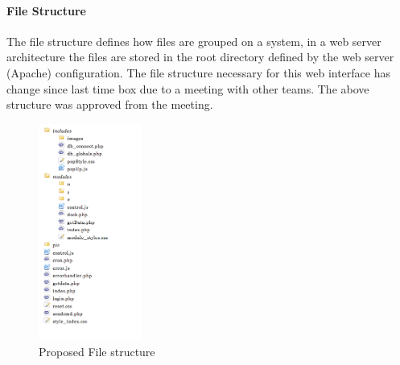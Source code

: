 \paragraph{File Structure}
The file structure defines how files are grouped on a system, in a web server architecture the files are stored in the root directory defined by the web server (Apache) configuration. The file structure necessary for this web interface has change since last time box due to a meeting with other teams. The above structure was approved from the meeting.

\begin{figure}[H]
	\begin{centering}
		\includegraphics[width=0.3\textwidth]{images/file_structure.png}
		\caption{Proposed File structure}
	\end{centering}
\end{figure}

